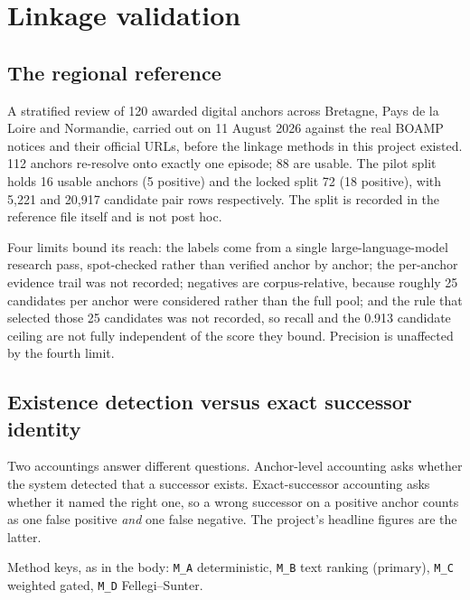 \section{Linkage validation}
\label{app:linkage}

\subsection*{The regional reference}

A stratified review of 120 awarded digital anchors across Bretagne, Pays de la Loire and Normandie, carried
out on 11 August 2026 against the real BOAMP notices and their official URLs, before the linkage methods in
this project existed. 112 anchors re-resolve onto exactly one episode; 88 are usable. The pilot split holds
16 usable anchors (5 positive) and the locked split 72 (18 positive), with 5,221 and 20,917 candidate pair
rows respectively. The split is recorded in the reference file itself and is not post hoc.

Four limits bound its reach: the labels come from a single large-language-model research pass, spot-checked
rather than verified anchor by anchor; the per-anchor evidence trail was not recorded; negatives are
corpus-relative, because roughly 25 candidates per anchor were considered rather than the full pool; and the
rule that selected those 25 candidates was not recorded, so recall and the 0.913 candidate ceiling are not
fully independent of the score they bound. Precision is unaffected by the fourth limit.

\subsection*{Existence detection versus exact successor identity}

Two accountings answer different questions. Anchor-level accounting asks whether the system detected that a
successor exists. Exact-successor accounting asks whether it named the right one, so a wrong successor on a
positive anchor counts as one false positive \emph{and} one false negative. The project's headline figures
are the latter.

Method keys, as in the body: \texttt{M\_A} deterministic, \texttt{M\_B} text ranking (primary), \texttt{M\_C} weighted gated, \texttt{M\_D} Fellegi--Sunter.

